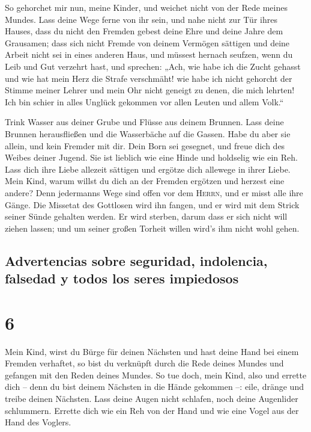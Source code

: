  So gehorchet mir nun, meine Kinder, und weichet nicht von
der Rede meines Mundes.  Lass deine Wege ferne von ihr
sein, und nahe nicht zur Tür ihres Hauses,  dass du nicht
den Fremden gebest deine Ehre und deine Jahre dem Grausamen;
 dass sich nicht Fremde von deinem Vermögen sättigen und
deine Arbeit nicht sei in eines anderen Haus,  und
müssest hernach seufzen, wenn du Leib und Gut verzehrt hast,
 und sprechen: „Ach, wie habe ich die Zucht gehasst und
wie hat mein Herz die Strafe verschmäht!  wie habe ich
nicht gehorcht der Stimme meiner Lehrer und mein Ohr nicht geneigt zu
denen, die mich lehrten!  Ich bin schier in alles Unglück
gekommen vor allen Leuten und allem Volk.``

 Trink Wasser aus deiner Grube und Flüsse aus deinem
Brunnen.  Lass deine Brunnen herausfließen und die
Wasserbäche auf die Gassen.  Habe du aber sie allein, und
kein Fremder mit dir.  Dein Born sei gesegnet, und freue
dich des Weibes deiner Jugend.  Sie ist lieblich wie eine
Hinde und holdselig wie ein Reh. Lass dich ihre Liebe allezeit sättigen
und ergötze dich allewege in ihrer Liebe.  Mein Kind,
warum willst du dich an der Fremden ergötzen und herzest eine andere?
 Denn jedermanns Wege sind offen vor dem \textsc{Herrn},
und er misst alle ihre Gänge.  Die Missetat des Gottlosen
wird ihn fangen, und er wird mit dem Strick seiner Sünde gehalten
werden.  Er wird sterben, darum dass er sich nicht will
ziehen lassen; und um seiner großen Torheit willen wird's ihm nicht wohl
gehen.

\hypertarget{advertencias-sobre-seguridad-indolencia-falsedad-y-todos-los-seres-impiedosos}{%
\subsection{Advertencias sobre seguridad, indolencia, falsedad y todos
los seres
impiedosos}\label{advertencias-sobre-seguridad-indolencia-falsedad-y-todos-los-seres-impiedosos}}

\hypertarget{section-5}{%
\section{6}\label{section-5}}

 Mein Kind, wirst du Bürge für deinen Nächsten und hast
deine Hand bei einem Fremden verhaftet,  so bist du
verknüpft durch die Rede deines Mundes und gefangen mit den Reden deines
Mundes.  So tue doch, mein Kind, also und errette dich --
denn du bist deinem Nächsten in die Hände gekommen --: eile, dränge und
treibe deinen Nächsten.  Lass deine Augen nicht schlafen,
noch deine Augenlider schlummern.  Errette dich wie ein
Reh von der Hand und wie eine Vogel aus der Hand des Voglers.

